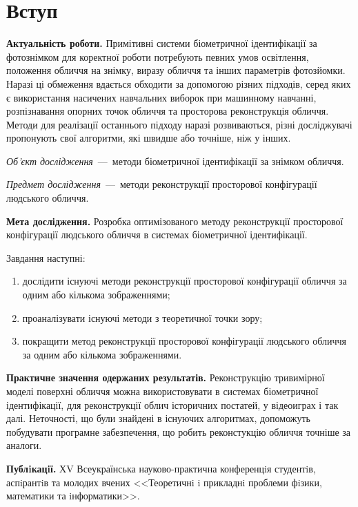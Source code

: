 \chapter*{Вступ}

\textbf{Актуальність роботи.}
Примітивні системи біометричної ідентифікації за фотознімком
для коректної роботи потребують певних умов
освітлення, положення обличчя на знімку, виразу обличчя
та інших параметрів фотозйомки.
Наразі ці обмеження вдається обходити за допомогою різних підходів,
серед яких є
використання насичених навчальних виборок при машинному навчанні,
розпізнавання опорних точок обличчя
та просторова реконструкція обличчя.
Методи для реалізації останнього підходу наразі розвиваються,
різні досліджувачі пропонують свої алгоритми,
які швидше або точніше, ніж у інших.

\textit{Об’єкт дослідження}~---~методи біометричної ідентифікації за
знімком обличчя.

\textit{Предмет дослідження}~---~методи реконструкції просторової конфігурації
людського обличчя.

\textbf{Мета дослідження.}
Розробка оптимізованого методу реконструкції просторової конфігурації
людського обличчя в системах біометричної ідентифікації.

Завдання наступні:
\begin{enumerate}
  \item
    дослідити існуючі методи реконструкції просторової конфігурації обличчя
    за одним або кількома зображеннями;
  \item
    проаналізувати існуючі методи з теоретичної точки зору;
  \item
    покращити метод реконструкції просторової конфігурації людського обличчя
    за одним або кількома зображеннями.
\end{enumerate}

\textbf{Практичне значення одержаних результатів.}
Реконструкцію тривимірної моделі поверхні обличчя
можна використовувати в системах біометричної ідентифікації,
для реконструкції облич історичних постатей,
у відеоиграх і так далі.
Неточності, що були знайдені в існуючих алгоритмах,
допоможуть побудувати програмне забезпечення,
що робить реконстукцію обличчя точніше за аналоги.

\textbf{Публiкацiї.}
ХV Всеукраїнська науково-практична конференцiя студентiв,
аспiрантiв та молодих вчених
<<Теоретичнi i прикладнi проблеми фiзики, математики та iнформатики>>.
